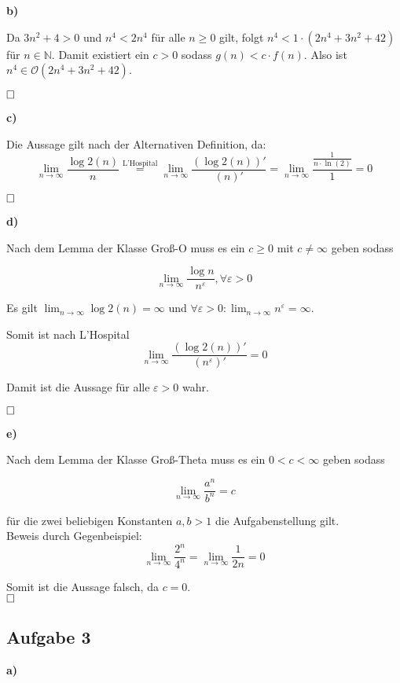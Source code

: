 \documentclass[a4paper,graphics,11pt]{article}
\newcommand{\aufgabe}[1]{\subsection*{Aufgabe #1}}
\begin{document}
\textbf{b)}

Da $3n^2+4 > 0$ und $ n^4 < 2n^4 $ für alle $n \geq 0$ gilt, folgt
$n^4 < 1 \cdot(2n^4+3n^2+42)$ für $n \in \mathbb{N}$. Damit existiert ein $c > 0$ sodass $g(n) < c \cdot f(n)$. Also ist $n^4 \in \mathcal{O}(2n^4+3n^2+42)$.

$\hfill\square$



\textbf{c)}

Die Aussage gilt nach der Alternativen Definition, da:
$$
\lim_{n\rightarrow\infty} \frac{\log2(n)}{n} \overset{\text{L'Hospital}}{=} \lim_{n\rightarrow\infty} \frac{(\log2(n))'}{(n)'} = \lim_{n\rightarrow\infty} \frac{\frac{1}{n\cdot \ln(2)}}{1} = 0
$$

$\hfill\square$



\textbf{d)}

Nach dem Lemma der Klasse Groß-O muss es ein $c \geq 0$ mit $c \neq \infty$ geben sodass

$$
\lim_{n\rightarrow\infty} \frac{\log n}{n^\varepsilon}, \forall \varepsilon > 0
$$

Es gilt $\lim_{n\rightarrow\infty} \log2 (n) = \infty$ und $\forall\varepsilon > 0 :
\lim_{n\rightarrow\infty}  n^\varepsilon = \infty$.

Somit ist nach L'Hospital 
$$
\lim_{n\rightarrow\infty} \frac{(\log2(n))'}{(n^\varepsilon)'} = 0
$$

Damit ist die Aussage für alle $\varepsilon>0$ wahr.

$\hfill\square$

\textbf{e)}


Nach dem Lemma der Klasse Groß-Theta muss es ein $ 0 < c< \infty$ geben sodass

$$
\lim_{n\rightarrow\infty} \frac{a^n}{b^n} = c
$$

für die zwei beliebigen Konstanten $a,b > 1$ die Aufgabenstellung gilt.\\
Beweis durch Gegenbeispiel:\\
$$
\lim_{n\rightarrow\infty} \frac{2^n}{4^n} = \lim_{n\rightarrow\infty} \frac{1}{2n} = 0
$$

Somit ist die Aussage falsch, da $c=0$.\\

$\hfill\square$

\newpage

\aufgabe{3}
\textbf{a)}
\end{document}
